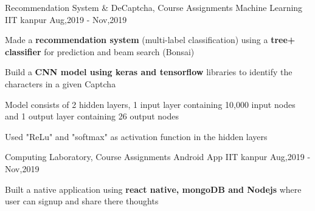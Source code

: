 \begin{cventries}
\begin{comment}
  \cventry
  {Compilers, Course Project}
  {JAVA lexer and Parser}
  {IIT kanpur}
  {Jan,2020 - March,2020}
  {
     \begin{cvitems}
      \item Learned and used lex (lexical analyzer), YACC and ANTLR (Parser).
      \item Used lex for lexical analysis for JAVA8 and also ANTLR(LL* Parser) for lexing and parsing JAVA8 code.
      \item Made Abstract Syntax Tree of JAVA code using graphviz.
     \end{cvitems}
  }

  \cventry
  {Operating Systems, Course Work}
  {Learning Intricacies of OS using GemOS}
  {IIT kanpur}
  {Aug,2019 - Nov,2019}
  {
     \begin{cvitems}
      \item Implemented and tested various operating system design such as paging, context switch, file system and multithreading:-
      \item \textbf{file system syscall} - open(), read(), write(), fork(), dup() etc.
      \item \textbf{paging management} using syscall like mmap(), munmap(), mprotect(), cfork() and vfork().
      \item \textbf{multithreaded hash table using locks and semaphores} for preventing simultaneous access. 
     \end{cvitems}
  }
\end{comment}
  \cventry
  {Recommendation System \& DeCaptcha, Course Assignments}
  {Machine Learning}
  {IIT kanpur}
  {Aug,2019 - Nov,2019}
  {
     \begin{cvitems}
      \item Made a \textbf{recommendation system} (multi-label classification) using a \textbf{tree+ classifier} for prediction and beam search (Bonsai)
      \item Build a \textbf{CNN model using keras and tensorflow} libraries to identify the characters in a given Captcha 
      \item Model consists of 2 hidden layers, 1 input layer containing 10,000 input nodes and 1 output layer containing 26 output nodes
      \item Used "ReLu" and "softmax" as activation function in the hidden layers 
     \end{cvitems}
  }

  \cventry
  {Computing Laboratory, Course Assignments}
  {Android App}
  {IIT kanpur}
  {Aug,2019 - Nov,2019}
  {
     \begin{cvitems}
      \item Built a native application using \textbf{react native, mongoDB and Nodejs} where user can signup and share there thoughts 
     \end{cvitems}
  }


\end{cventries}
